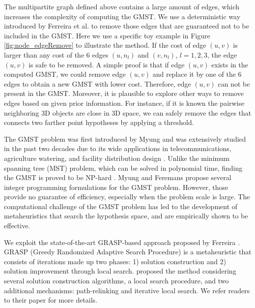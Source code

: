The multipartite graph defined above contains a large amount of edges, which increases the complexity of computing the GMST.
We use a deterministic way introduced by Ferreira et al. \cite{Ferreira_ESWA2012} to remove those edges that are guaranteed not to be included in the GMST. Here we use a specific toy example in Figure \ref{fig:node_edgeRemove} to illustrate the method. If the cost of edge $(u,v)$ is larger than any cost of the 6 edges $(u,n_l)$ and $(v,n_l)$, $l=1,2,3$, the edge $(u,v)$ is safe to be removed. A simple proof is that if edge $(u,v)$ exists in the computed GMST, we could remove edge $(u,v)$ and replace it by one of the 6 edges to obtain a new GMST with lower cost. Therefore, edge $(u,v)$ can not be present in the GMST. Moreover, it is plausible to explore other ways to remove edges based on given prior information. For instance, if it is known the pairwise neighboring 3D objects are close in 3D space, we can safely remove the edges that connects two farther point hypotheses by applying a threshold.

The GMST problem was first introduced by Myung \citet{MyungLT_95} and was extensively studied in the past two decades \cite{Feremans_LL02,MyungLT_95,Oncan_CL08,Ferreira_ESWA2012,Dror_EJOR} due to its wide applications in  telecommunications, agriculture watering, and facility distribution design \cite{MyungLT_95,Dror_EJOR}. Unlike the minimum spanning tree (MST) problem, which can be solved in polynomial time, finding the GMST is proved to be NP-hard \cite{MyungLT_95}. Myung \etal \cite{MyungLT_95} and Feremans \etal \cite{Feremans_LL02} propose several integer programming formulations for the GMST problem. However, those provide no guarantee of efficiency, especially when the problem scale is large. The computational challenge of the GMST problem has led to the development of metaheuristics \cite{Oncan_CL08,Ferreira_ESWA2012} that search the hypothesis space, and are empirically shown to be effective.

We exploit the state-of-the-art GRASP-based approach proposed by Ferreira \etal \cite{Ferreira_ESWA2012}. GRASP (Greedy Randomized Adaptive Search Procedure) is a metaheuristic that consists of iterations made up two phases: 1) solution construction and 2) solution improvement through local search. \citet{Ferreira_ESWA2012} proposed the method considering several solution construction algorithms, a local search procedure, and two additional mechanisms: path-relinking and iterative local search. We refer readers to their paper \cite{Ferreira_ESWA2012} for more details.

